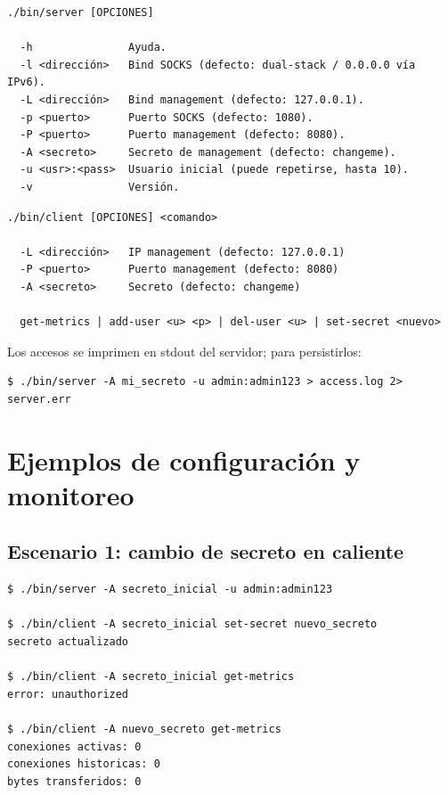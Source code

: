 \documentclass[12pt,a4paper]{article}
\begin{document}
\begin{lstlisting}[caption=Opciones del servidor]
./bin/server [OPCIONES]

  -h               Ayuda.
  -l <dirección>   Bind SOCKS (defecto: dual-stack / 0.0.0.0 vía IPv6).
  -L <dirección>   Bind management (defecto: 127.0.0.1).
  -p <puerto>      Puerto SOCKS (defecto: 1080).
  -P <puerto>      Puerto management (defecto: 8080).
  -A <secreto>     Secreto de management (defecto: changeme).
  -u <usr>:<pass>  Usuario inicial (puede repetirse, hasta 10).
  -v               Versión.
\end{lstlisting}

\begin{lstlisting}[caption=Opciones del cliente]
./bin/client [OPCIONES] <comando>

  -L <dirección>   IP management (defecto: 127.0.0.1)
  -P <puerto>      Puerto management (defecto: 8080)
  -A <secreto>     Secreto (defecto: changeme)

  get-metrics | add-user <u> <p> | del-user <u> | set-secret <nuevo>
\end{lstlisting}

Los accesos se imprimen en stdout del servidor; para persistirlos:

\begin{lstlisting}[caption=Redirección de logs a archivo]
$ ./bin/server -A mi_secreto -u admin:admin123 > access.log 2> server.err
\end{lstlisting}

\section{Ejemplos de configuración y monitoreo}

\subsection{Escenario 1: cambio de secreto en caliente}

\begin{lstlisting}
$ ./bin/server -A secreto_inicial -u admin:admin123

$ ./bin/client -A secreto_inicial set-secret nuevo_secreto
secreto actualizado

$ ./bin/client -A secreto_inicial get-metrics
error: unauthorized

$ ./bin/client -A nuevo_secreto get-metrics
conexiones activas: 0
conexiones historicas: 0
bytes transferidos: 0
\end{lstlisting}
\end{document}
